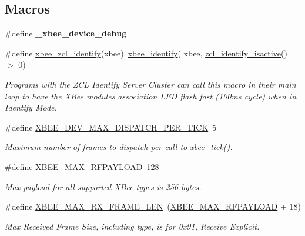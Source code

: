 \subsection*{Macros}
\begin{DoxyCompactItemize}
\item 
\mbox{\label{group__xbee__device_ga86812c9b592261c600106f7b9afe26a1}} 
\#define {\bfseries \+\_\+xbee\+\_\+device\+\_\+debug}
\item 
\#define \hyperlink{group__xbee__device_gaece12bbe1dd3135e51f714b485ed0cf2}{xbee\+\_\+zcl\+\_\+identify}(xbee)~\hyperlink{group__xbee__device_ga42768d8f8aa841ed4f42396cff2815aa}{xbee\+\_\+identify}( xbee, \hyperlink{group__zcl__identify_ga95b00d55b861c1ea6033c16794ae818d}{zcl\+\_\+identify\+\_\+isactive}() $>$ 0)
\begin{DoxyCompactList}\small\item\em Programs with the Z\+CL Identify Server Cluster can call this macro in their main loop to have the X\+Bee module\textquotesingle{}s association L\+ED flash fast (100ms cycle) when in Identify Mode. \end{DoxyCompactList}\item 
\mbox{\label{group__xbee__device_gaeaab23929fe74420e519d21bba8008e6}} 
\#define \hyperlink{group__xbee__device_gaeaab23929fe74420e519d21bba8008e6}{X\+B\+E\+E\+\_\+\+D\+E\+V\+\_\+\+M\+A\+X\+\_\+\+D\+I\+S\+P\+A\+T\+C\+H\+\_\+\+P\+E\+R\+\_\+\+T\+I\+CK}~5
\begin{DoxyCompactList}\small\item\em Maximum number of frames to dispatch per call to xbee\+\_\+tick(). \end{DoxyCompactList}\item 
\#define \hyperlink{group__xbee__device_gaea0dcde46961aae6f1cf5949be02d1a6}{X\+B\+E\+E\+\_\+\+M\+A\+X\+\_\+\+R\+F\+P\+A\+Y\+L\+O\+AD}~128
\begin{DoxyCompactList}\small\item\em Max payload for all supported X\+Bee types is 256 bytes. \end{DoxyCompactList}\item 
\#define \hyperlink{group__xbee__device_gaefbbf0c7c5b7560f7137e5ff2cab4e45}{X\+B\+E\+E\+\_\+\+M\+A\+X\+\_\+\+R\+X\+\_\+\+F\+R\+A\+M\+E\+\_\+\+L\+EN}~(\hyperlink{group__xbee__device_gaea0dcde46961aae6f1cf5949be02d1a6}{X\+B\+E\+E\+\_\+\+M\+A\+X\+\_\+\+R\+F\+P\+A\+Y\+L\+O\+AD} + 18)
\begin{DoxyCompactList}\small\item\em Max Received Frame Size, including type, is for 0x91, Receive Explicit. \end{DoxyCompactList}\item 

\end{DoxyCompactItemize}

